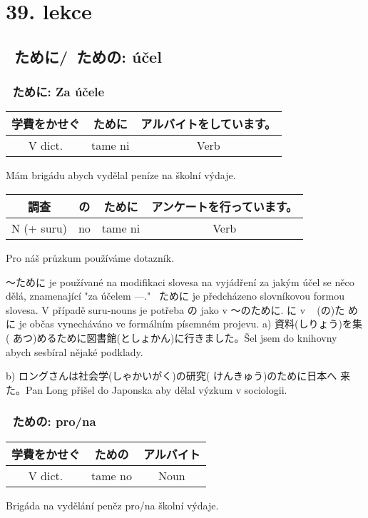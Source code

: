 \section{39. lekce}
\label{sec:lekce_39}

\subsection{ ~ために/~ための: účel}
\subsubsection{ ~ために: Za účele~}
\begin{center}
\begin{tabular}{|c|c|c|}
学費をかせぐ& ために &アルバイトをしています。\\
\hline
V dict. &tame ni& Verb\\
\hline
\end{tabular}
\end{center}
Mám brigádu abych vydělal peníze na školní výdaje.



\begin{center}
\begin{tabular}{|c|c|c|c|}
\hline
調查&の &ために&アンケートを行っています。\\
\hline
N (+ suru) &no&tame ni&Verb\\
\hline
\end{tabular}
\end{center}
Pro náš průzkum používáme dotazník.

〜ために je používané na modifikaci slovesa na vyjádření za jakým účel se něco dělá, znamenající "za účelem ---." ~ために je předcházeno slovníkovou formou slovesa. V případě suru-nouns je potřeba の jako v  〜のために.  に v ~ (の)た めに je občas vynecháváno ve formálním písemném projevu. 
a) 資料(しりょう)を集( あつ)めるために図書館(としょかん)に行きました。Šel jsem do knihovny abych sesbíral nějaké podklady.



b) ロングさんは社会学(しゃかいがく)の研究( けんきゅう)のために日本へ 来た。Pan Long přišel do Japonska aby dělal výzkum v sociologii.

\subsubsection{~ための: pro/na}
\begin{center}
\begin{tabular}{|c|c|c|}
\hline
学費をかせぐ&ための&アルバイト\\
\hline
V dict.&tame no&Noun\\
\hline
\end{tabular}
\end{center}
Brigáda na vydělání peněz  pro/na školní výdaje.



